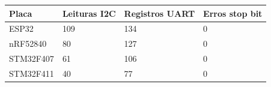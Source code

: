 \begin{tabular}{llll}
\hline
Placa & Leituras I2C & Registros UART & Erros stop bit \\
\hline
ESP32 & 109 & 134 & 0 \\
nRF52840 & 80 & 127 & 0 \\
STM32F407 & 61 & 106 & 0 \\
STM32F411 & 40 & 77 & 0 \\
\hline
\end{tabular}

